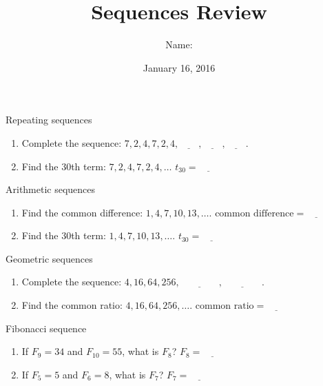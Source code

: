 \documentclass[12pt,letterpaper]{article}
\title{Sequences Review}
\author{Name: \underline{\hspace{5cm}}}
\date{January 16, 2016}
\begin{document}
\maketitle

\thispagestyle{empty}

\begin{problem}{Repeating sequences}
\begin{enumerate}
 \item Complete the sequence:
 $7, 2, 4, 7, 2, 4, \underline{\hspace{2em}}, \underline{\hspace{2em}},
 \underline{\hspace{2em}}$.
 \item  Find the $30$th term:
 $7, 2, 4, 7, 2, 4, \ldots$ \hfill $t_{30} = \underline{\hspace{2em}}$
\end{enumerate}
\end{problem}

\begin{problem}{Arithmetic sequences}
\begin{enumerate}
 \item
 Find the common difference:
 $1, 4, 7, 10, 13, \ldots$. \hfill
 $\text{common difference} = \underline{\hspace{2em}}$

 \item
 Find the $30$th term:
 $1, 4, 7, 10, 13, \ldots$. \hfill
 $t_{30} = \underline{\hspace{2em}}$
\end{enumerate}
\end{problem}

\begin{problem}{Geometric sequences}
\begin{enumerate}
 \item
 Complete the sequence:
 $4, 16, 64, 256, \underline{\hspace{4em}}, \underline{\hspace{4em}}$.

 \item
 Find the common ratio:
 $4, 16, 64, 256, \ldots$. \hfill
 $\text{common ratio} = \underline{\hspace{2em}}$
\end{enumerate}
\end{problem}

\begin{problem}{Fibonacci sequence}
\begin{enumerate}
 \item
 If $F_9=34$ and $F_{10}=55$, what is $F_8$? \hfill
 $F_8 = \underline{\hspace{2em}}$

 \item
 If $F_5=5$ and $F_6=8$, what is $F_7$? \hfill
 $F_7 = \underline{\hspace{2em}}$
\end{enumerate}
\end{problem}
\end{document}
